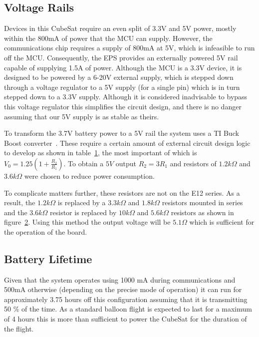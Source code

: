 \subsection{Voltage Rails}
Devices in this CubeSat require an even split of 3.3V and 5V power, mostly within the 800mA of power that the MCU can supply.  However, the communications chip requires a supply of 800mA at 5V, which is infeasible to run off the MCU.  Consequently, the EPS provides an externally powered 5V rail capable of supplying 1.5A of power.  Although the MCU is a 3.3V device, it is designed to be powered by a 6-20V external supply, which is stepped down through a voltage regulator to a 5V supply (for a single pin) which is in turn stepped down to a 3.3V supply.  Although it is considered inadvisable to bypass this voltage regulator this simplifies the circuit design, and there is no danger assuming that our 5V supply is as stable as theirs.

To transform the 3.7V battery power to a 5V rail the system uses a TI Buck Boost converter~\cite{bbdatasheet}.  These require a certain amount of external circuit design logic to develop as shown in table~\ref{fig:ticalcs},  the most important of which is $V_0 = 1.25(1+\frac{R_2}{R_1})$.  To obtain a $5V$ output $R_2 = 3 R_1$ and resistors of $1.2k \Omega $ and $3.6k\Omega$ were chosen to reduce power consumption.  

\begin{figure}[H]
	\label{fig:ticalcs}
\end{figure}

To complicate matters further, these resistors are not on the E12 series.  As a result, the $1.2k\Omega$ is replaced by a $3.3k\Omega$ and $1.8k\Omega$ resistors mounted in series and the $3.6k\Omega$ resistor is replaced by $10k\Omega$ and $5.6k\Omega$ resistors as shown in figure~\ref{fig:highlighted}.  Using this method the output voltage will be $5.1 \Omega$ which is sufficient for the operation of the board.

\begin{figure}[H]
	\label{fig:highlighted}
\end{figure}

\subsection{Battery Lifetime}
Given that the system operates using 1000 mA during communications and 500mA otherwise (depending on the precise mode of operation) it can run for approximately 3.75 hours off this configuration assuming that it is transmitting 50 \% of the time.  As a standard balloon flight is expected to last for a maximum of 4 hours this is more than sufficient to power the CubeSat for the duration of the flight.